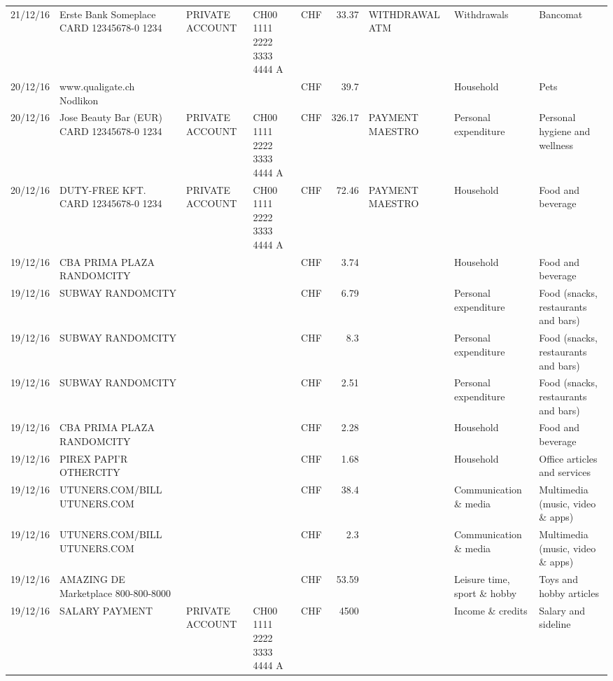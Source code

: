 \begin{landscape}
\begin{table}[h]
\begin{center}
\begin{tabular}{rllllrlll}
		21/12/16 & Erste Bank Someplace CARD 12345678-0 1234 & PRIVATE ACCOUNT & CH00 1111 2222 3333 4444 A & CHF   & 33.37 & WITHDRAWAL ATM & Withdrawals & Bancomat \\
		20/12/16 & www.qualigate.ch          Nodlikon &       &       & CHF   & 39.7  &       & Household & Pets \\
		20/12/16 & Jose Beauty Bar (EUR) CARD 12345678-0 1234 & PRIVATE ACCOUNT & CH00 1111 2222 3333 4444 A & CHF   & 326.17 & PAYMENT MAESTRO & Personal expenditure & Personal hygiene and wellness \\
		20/12/16 & DUTY-FREE KFT. CARD 12345678-0 1234 & PRIVATE ACCOUNT & CH00 1111 2222 3333 4444 A & CHF   & 72.46 & PAYMENT MAESTRO & Household & Food and beverage \\
		19/12/16 & CBA PRIMA PLAZA        RANDOMCITY &       &       & CHF   & 3.74  &       & Household & Food and beverage \\
		19/12/16 & SUBWAY                   RANDOMCITY &       &       & CHF   & 6.79  &       & Personal expenditure & Food (snacks, restaurants and bars) \\
		19/12/16 & SUBWAY                   RANDOMCITY &       &       & CHF   & 8.3   &       & Personal expenditure & Food (snacks, restaurants and bars) \\
		19/12/16 & SUBWAY                   RANDOMCITY &       &       & CHF   & 2.51  &       & Personal expenditure & Food (snacks, restaurants and bars) \\
		19/12/16 & CBA PRIMA PLAZA        RANDOMCITY &       &       & CHF   & 2.28  &       & Household & Food and beverage \\
		19/12/16 & PIREX PAPI'R             OTHERCITY &       &       & CHF   & 1.68  &       & Household & Office articles and services \\
		19/12/16 & UTUNERS.COM/BILL          UTUNERS.COM &       &       & CHF   & 38.4  &       & Communication \& media & Multimedia (music, video \& apps) \\
		19/12/16 & UTUNERS.COM/BILL          UTUNERS.COM &       &       & CHF   & 2.3   &       & Communication \& media & Multimedia (music, video \& apps) \\
		19/12/16 & AMAZING DE Marketplace    800-800-8000 &       &       & CHF   & 53.59 &       & Leisure time, sport \& hobby & Toys and hobby articles \\
		19/12/16 & SALARY PAYMENT & PRIVATE ACCOUNT & CH00 1111 2222 3333 4444 A & CHF   & 4500  &       & Income \& credits & Salary and sideline \\

\end{tabular}
\end{center}
\end{table}
\end{landscape}
